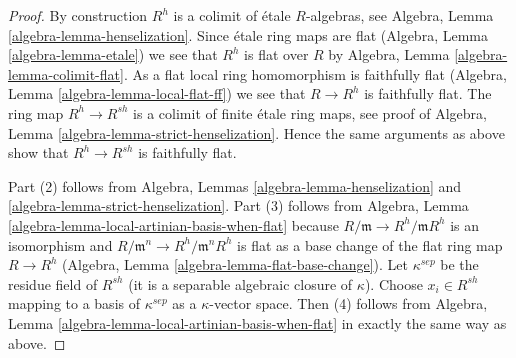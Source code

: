 \documentclass[10pt,a4paper]{amsart}
\theoremstyle{plain}
\theoremstyle{definition}
\theoremstyle{remark}
\numberwithin{equation}{subsection}
\begin{document}
\begin{proof}
By construction $R^h$ is a colimit of \'etale $R$-algebras, see
Algebra, Lemma \ref{algebra-lemma-henselization}. Since \'etale
ring maps are flat (Algebra, Lemma \ref{algebra-lemma-etale}) we see that
$R^h$ is flat over $R$ by
Algebra, Lemma \ref{algebra-lemma-colimit-flat}.
As a flat local ring homomorphism is faithfully flat
(Algebra, Lemma \ref{algebra-lemma-local-flat-ff})
we see that $R \to R^h$ is faithfully flat.
The ring map $R^h \to R^{sh}$ is a colimit of finite \'etale ring
maps, see proof of Algebra, Lemma \ref{algebra-lemma-strict-henselization}.
Hence the same arguments as above show that $R^h \to R^{sh}$ is
faithfully flat.

\medskip\noindent
Part (2) follows from Algebra, Lemmas \ref{algebra-lemma-henselization} and
\ref{algebra-lemma-strict-henselization}. Part (3) follows from
Algebra, Lemma \ref{algebra-lemma-local-artinian-basis-when-flat}
because $R/\mathfrak m \to R^h/\mathfrak mR^h$ is an isomorphism and
$R/\mathfrak m^n \to R^h/\mathfrak m^nR^h$ is flat as a base change of
the flat ring map $R \to R^h$
(Algebra, Lemma \ref{algebra-lemma-flat-base-change}).
Let $\kappa^{sep}$ be the residue field of $R^{sh}$ (it is a
separable algebraic closure of $\kappa$). Choose $x_i \in R^{sh}$
mapping to a basis of $\kappa^{sep}$ as a $\kappa$-vector space.
Then (4) follows from
Algebra, Lemma \ref{algebra-lemma-local-artinian-basis-when-flat}
in exactly the same way as above.
\end{proof}
\end{document}
